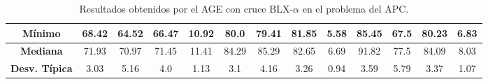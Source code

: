 \documentclass[11pt,a4paper]{article}
\begin{document}
\begin{table}[H]
{\begin{tabular}{c|c|c|c|c|c|c|c|c|c|c|c|c|}
\multicolumn{1}{|c|}{\textbf{Mínimo}}       & 68.42             & 64.52                   & 66.47         & 10.92      & 80.0              & 79.41          & 81.85         & 5.58       & 85.45             & 67.5           & 80.23         & 6.83       \\ \hline
\multicolumn{1}{|c|}{\textbf{Mediana}}      & 71.93             & 70.97                   & 71.45         & 11.41      & 84.29             & 85.29          & 82.65         & 6.69       & 91.82             & 77.5           & 84.09         & 8.03       \\ \hline
\multicolumn{1}{|c|}{\textbf{Desv. Típica}} & 3.03              & 5.16                    & 4.0           & 1.13       & 3.1               & 4.16           & 3.26          & 0.94       & 3.59              & 5.79           & 3.37          & 1.07       \\ \hline
\end{tabular}
}%
\caption{Resultados obtenidos por el AGE con cruce BLX-$\alpha$ en el problema del APC.}
\end{table}
\end{document}
